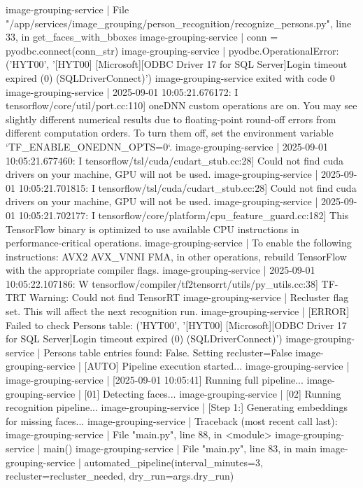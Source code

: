 image-grouping-service  |   File "/app/services/image_grouping/person_recognition/recognize_persons.py", line 33, in get_faces_with_bboxes
image-grouping-service  |     conn = pyodbc.connect(conn_str)
image-grouping-service  | pyodbc.OperationalError: ('HYT00', '[HYT00] [Microsoft][ODBC Driver 17 for SQL Server]Login timeout expired (0) (SQLDriverConnect)')
image-grouping-service exited with code 0
image-grouping-service  | 2025-09-01 10:05:21.676172: I tensorflow/core/util/port.cc:110] oneDNN custom operations are on. You may see slightly different numerical results due to floating-point round-off errors from different computation orders. To turn them off, set the environment variable `TF_ENABLE_ONEDNN_OPTS=0`.
image-grouping-service  | 2025-09-01 10:05:21.677460: I tensorflow/tsl/cuda/cudart_stub.cc:28] Could not find cuda drivers on your machine, GPU will not be used.
image-grouping-service  | 2025-09-01 10:05:21.701815: I tensorflow/tsl/cuda/cudart_stub.cc:28] Could not find cuda drivers on your machine, GPU will not be used.
image-grouping-service  | 2025-09-01 10:05:21.702177: I tensorflow/core/platform/cpu_feature_guard.cc:182] This TensorFlow binary is optimized to use available CPU instructions in performance-critical operations.
image-grouping-service  | To enable the following instructions: AVX2 AVX_VNNI FMA, in other operations, rebuild TensorFlow with the appropriate compiler flags.
image-grouping-service  | 2025-09-01 10:05:22.107186: W tensorflow/compiler/tf2tensorrt/utils/py_utils.cc:38] TF-TRT Warning: Could not find TensorRT
image-grouping-service  | Recluster flag set. This will affect the next recognition run.
image-grouping-service  | [ERROR] Failed to check Persons table: ('HYT00', '[HYT00] [Microsoft][ODBC Driver 17 for SQL Server]Login timeout expired (0) (SQLDriverConnect)')
image-grouping-service  | Persons table entries found: False. Setting recluster=False
image-grouping-service  | [AUTO] Pipeline execution started...
image-grouping-service  |
image-grouping-service  | [2025-09-01 10:05:41] Running full pipeline...
image-grouping-service  | [01] Detecting faces...
image-grouping-service  | [02] Running recognition pipeline...
image-grouping-service  | [Step 1:] Generating embeddings for missing faces...
image-grouping-service  | Traceback (most recent call last):
image-grouping-service  |   File "main.py", line 88, in <module>
image-grouping-service  |     main()
image-grouping-service  |   File "main.py", line 83, in main
image-grouping-service  |     automated_pipeline(interval_minutes=3, recluster=recluster_needed, dry_run=args.dry_run)
